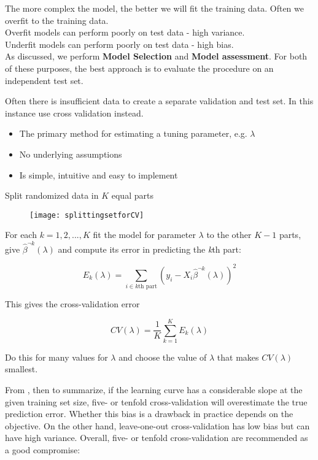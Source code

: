 The more complex the model, the better we will fit the training data.
Often we overfit to the training data.\\

Overfit models can perform poorly on test data - high variance.\\


Underfit models can perform poorly on test data - high bias.\\

As discussed, we perform \textbf{Model Selection} and \textbf{Model assessment}. For both of these purposes, the best approach is to evaluate the procedure on an independent test set. \cite[p.~]{lecture2}



Often there is insufficient data to create a separate validation and test set. In this instance use cross validation instead.\cite[p.~30]{lecture2}

\begin{itemize}
  \item The primary method for estimating a tuning parameter, e.g. $\lambda$
  \item No underlying assumptions
  \item Is simple, intuitive and easy to implement
\end{itemize}

Split randomized data in $K$ equal parts

\begin{figure}[H]
  \centering
  \texttt{[image: splittingsetforCV]}
\end{figure}

For each $k = 1, 2, ... , K$ fit the model for parameter $\lambda$ to the other $K-1$ parts, give $\hat{\beta}^{\neg k}(\lambda)$ and compute its error in predicting the \textit{k}th part:

\[
    E_k(\lambda) = \sum_{i \in k \text{th part}} (y_i - X_i \hat{\beta}^{\neg k}(\lambda))^2
\]

This gives the cross-validation error

\[
    CV ( \lambda) = \frac{1}{K} \sum_{k=1}^{K} E_k(\lambda)
\]

Do this for many values for $\lambda$ and choose the value of $\lambda$ that makes $CV(\lambda)$ smallest.

From \cite[p.~243]{friedman2016elements}, then to summarize, if the learning curve has a considerable slope at the given
training set size, five- or tenfold cross-validation will overestimate the true
prediction error. Whether this bias is a drawback in practice depends on
the objective. On the other hand, leave-one-out cross-validation has low
bias but can have high variance. Overall, five- or tenfold cross-validation
are recommended as a good compromise:\\

